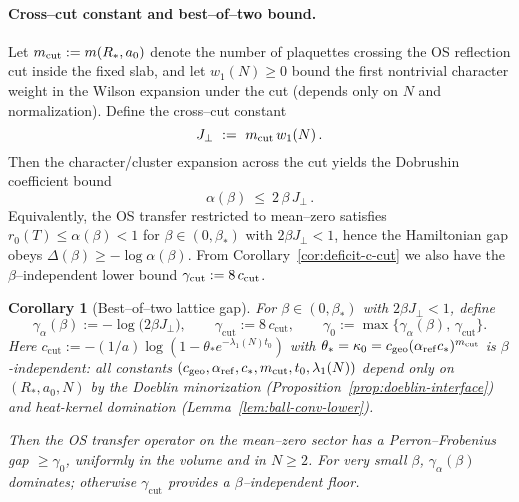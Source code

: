 \documentclass[11pt]{amsart}
\theoremstyle{plain}
\newtheorem{corollary}[theorem]{Corollary}
\theoremstyle{definition}
\theoremstyle{remark}
\begin{document}
\paragraph{Cross--cut constant and best--of--two bound.}
Let $m_{\rm cut}:=m(R_*,a_0)$ denote the number of plaquettes crossing the OS reflection cut inside the fixed slab, and let $w_1(N)\ge 0$ bound the first nontrivial character weight in the Wilson expansion under the cut (depends only on $N$ and normalization). Define the cross--cut constant
\[
  J_{\perp}
  \ :=\ m_{\rm cut}\,w_1(N)\,.
\]
Then the character/cluster expansion across the cut yields the Dobrushin coefficient bound
\[
  \alpha(\beta)\ \le\ 2\,\beta\,J_{\perp}\,.
\]
Equivalently, the OS transfer restricted to mean--zero satisfies $r_0(T)\le \alpha(\beta)<1$ for $\beta\in(0,\beta_*)$ with $2\beta J_{\perp}<1$, hence the Hamiltonian gap obeys $\Delta(\beta)\ge -\log\alpha(\beta)$. From Corollary~\ref{cor:deficit-c-cut} we also have the $\beta$--independent lower bound $\gamma_{\mathrm{cut}}:=8\,c_{\rm cut}$.

\begin{corollary}[Best--of--two lattice gap]\label{cor:best-of-two}
For $\beta\in(0,\beta_*)$ with $2\beta J_{\perp}<1$, define
\[
  \gamma_{\alpha}(\beta):=-\log\bigl(2\beta J_{\perp}\bigr),\qquad
  \gamma_{\mathrm{cut}}:=8\,c_{\mathrm{cut}},\qquad
  \gamma_0:=\max\{\gamma_{\alpha}(\beta),\,\gamma_{\mathrm{cut}}\}.
\]
Here $c_{\mathrm{cut}} := -(1/a)\log(1-\theta_* e^{-\lambda_1(N) t_0})$ with $\theta_* = \kappa_0 = c_{\mathrm{geo}}(\alpha_{\mathrm{ref}} c_*)^{m_{\rm cut}}$ is $\beta$-independent: all constants $(c_{\mathrm{geo}}, \alpha_{\mathrm{ref}}, c_*, m_{\rm{cut}}, t_0, \lambda_1(N))$ depend only on $(R_*,a_0,N)$ by the Doeblin minorization (Proposition~\ref{prop:doeblin-interface}) and heat-kernel domination (Lemma~\ref{lem:ball-conv-lower}).

Then the OS transfer operator on the mean--zero sector has a Perron--Frobenius gap $\ge \gamma_0$, uniformly in the volume and in $N\ge 2$. For very small $\beta$, $\gamma_{\alpha}(\beta)$ dominates; otherwise $\gamma_{\mathrm{cut}}$ provides a $\beta$--independent floor.
\end{corollary}

\paragraph{}
\end{document}
